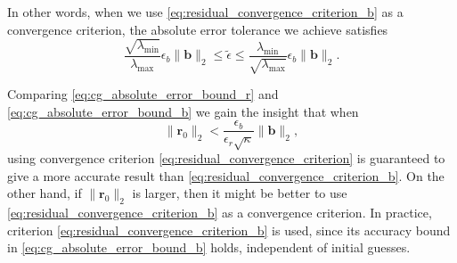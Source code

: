 In other words, when we use \cref{eq:residual_convergence_criterion_b} as a convergence criterion, the absolute error tolerance we achieve satisfies
\begin{equation}
  \frac{\sqrt{\lambda_{\text{min}}}}{\lambda_{\text{max}}}\epsilon_b\|\mathbf{b}\|_2 \leq \tilde{\epsilon} \leq \frac{\lambda_{\text{min}}}{\sqrt{\lambda_{\text{max}}}}\epsilon_b\|\mathbf{b}\|_2.
  \label{eq:cg_absolute_error_bound_b}
\end{equation}

Comparing \cref{eq:cg_absolute_error_bound_r} and \cref{eq:cg_absolute_error_bound_b} we gain the insight that when 
\[
  \|\mathbf{r}_0\|_2 < \frac{\epsilon_b}{\epsilon_r\sqrt{\kappa}}\|\mathbf{b}\|_2,
\]
using convergence criterion \cref{eq:residual_convergence_criterion} is guaranteed to give a more accurate result than \cref{eq:residual_convergence_criterion_b}. On the other hand, if $\|\mathbf{r}_0\|_2$ is larger, then it might be better to use \cref{eq:residual_convergence_criterion_b} as a convergence criterion. In practice, criterion \cref{eq:residual_convergence_criterion_b} is used, since its accuracy bound in \cref{eq:cg_absolute_error_bound_b} holds, independent of initial guesses.


